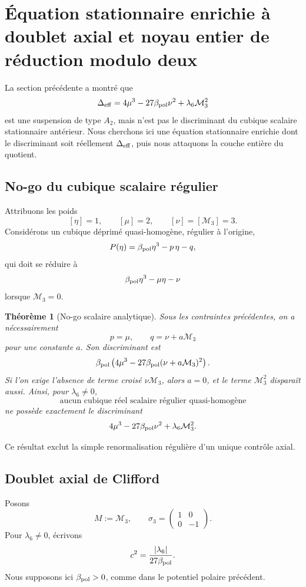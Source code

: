 \documentclass[11pt,a4paper]{article}
\newtheorem{theorem}{Théorème}[section]
\begin{document}
\section{Équation stationnaire enrichie à doublet axial et noyau entier de réduction modulo deux}\label{sec:v22-enriched-stationary-integral-kernel}

La section précédente a montré que
\[
\Delta_{\rm eff}
=
4\mu^3-27\beta_{\rm pol}\nu^2+\lambda_6\mathcal M_3^2
\]
est une suspension de type $A_2$, mais n'est pas le discriminant du cubique scalaire stationnaire antérieur. Nous cherchons ici une équation stationnaire enrichie dont le discriminant soit réellement $\Delta_{\rm eff}$, puis nous attaquons la couche entière du quotient.

\subsection{No-go du cubique scalaire régulier}

Attribuons les poids
\[
[\eta]=1,\qquad
[\mu]=2,\qquad
[\nu]=[\mathcal M_3]=3.
\]
Considérons un cubique déprimé quasi-homogène, régulier à l'origine,
\[
P(\eta)
=
\beta_{\rm pol}\eta^3-p\,\eta-q,
\]
qui doit se réduire à
\[
\beta_{\rm pol}\eta^3-\mu\eta-\nu
\]
lorsque $\mathcal M_3=0$.

\begin{theorem}[No-go scalaire analytique]\label{thm:v22-scalar-nogo}
Sous les contraintes précédentes, on a nécessairement
\[
p=\mu,
\qquad
q=\nu+a\mathcal M_3
\]
pour une constante $a$. Son discriminant est
\[
\beta_{\rm pol}
\left(
4\mu^3
-
27\beta_{\rm pol}
(\nu+a\mathcal M_3)^2
\right).
\]
Si l'on exige l'absence de terme croisé $\nu\mathcal M_3$, alors $a=0$, et le terme $\mathcal M_3^2$ disparaît aussi. Ainsi, pour $\lambda_6\neq0$,
\[
\boxed{
\text{aucun cubique réel scalaire régulier quasi-homogène}
}
\]
ne possède exactement le discriminant
\[
4\mu^3-27\beta_{\rm pol}\nu^2+\lambda_6\mathcal M_3^2.
\]
\end{theorem}

Ce résultat exclut la simple renormalisation régulière d'un unique contrôle axial.

\subsection{Doublet axial de Clifford}

Posons
\[
M:=\mathcal M_3,
\qquad
\sigma_3=
\begin{pmatrix}
1&0\\
0&-1
\end{pmatrix}.
\]
Pour $\lambda_6\neq0$, écrivons
\[
c^2
=
\frac{|\lambda_6|}{27\beta_{\rm pol}}.
\]
Nous supposons ici $\beta_{\rm pol}>0$, comme dans le potentiel polaire précédent.
\end{document}
